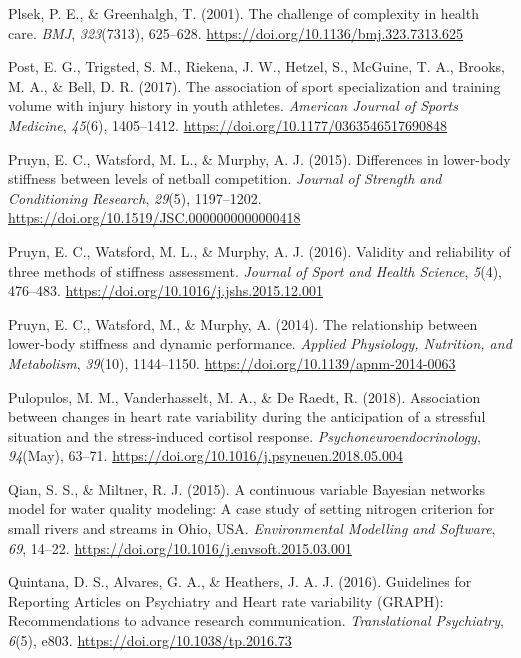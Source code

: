 \documentclass[
  english,
  man,floatsintext]{apa6}
\begin{document}
\leavevmode\hypertarget{ref-Plsek2001}{}%
Plsek, P. E., \& Greenhalgh, T. (2001). The challenge of complexity in health care. \emph{BMJ}, \emph{323}(7313), 625--628. \url{https://doi.org/10.1136/bmj.323.7313.625}

\leavevmode\hypertarget{ref-Post2017}{}%
Post, E. G., Trigsted, S. M., Riekena, J. W., Hetzel, S., McGuine, T. A., Brooks, M. A., \& Bell, D. R. (2017). The association of sport specialization and training volume with injury history in youth athletes. \emph{American Journal of Sports Medicine}, \emph{45}(6), 1405--1412. \url{https://doi.org/10.1177/0363546517690848}

\leavevmode\hypertarget{ref-Pruyn2015}{}%
Pruyn, E. C., Watsford, M. L., \& Murphy, A. J. (2015). Differences in lower-body stiffness between levels of netball competition. \emph{Journal of Strength and Conditioning Research}, \emph{29}(5), 1197--1202. \url{https://doi.org/10.1519/JSC.0000000000000418}

\leavevmode\hypertarget{ref-Pruyn2016}{}%
Pruyn, E. C., Watsford, M. L., \& Murphy, A. J. (2016). Validity and reliability of three methods of stiffness assessment. \emph{Journal of Sport and Health Science}, \emph{5}(4), 476--483. \url{https://doi.org/10.1016/j.jshs.2015.12.001}

\leavevmode\hypertarget{ref-Pruyn2014}{}%
Pruyn, E. C., Watsford, M., \& Murphy, A. (2014). The relationship between lower-body stiffness and dynamic performance. \emph{Applied Physiology, Nutrition, and Metabolism}, \emph{39}(10), 1144--1150. \url{https://doi.org/10.1139/apnm-2014-0063}

\leavevmode\hypertarget{ref-Pulopulos2018}{}%
Pulopulos, M. M., Vanderhasselt, M. A., \& De Raedt, R. (2018). Association between changes in heart rate variability during the anticipation of a stressful situation and the stress-induced cortisol response. \emph{Psychoneuroendocrinology}, \emph{94}(May), 63--71. \url{https://doi.org/10.1016/j.psyneuen.2018.05.004}

\leavevmode\hypertarget{ref-Qian2015}{}%
Qian, S. S., \& Miltner, R. J. (2015). A continuous variable Bayesian networks model for water quality modeling: A case study of setting nitrogen criterion for small rivers and streams in Ohio, USA. \emph{Environmental Modelling and Software}, \emph{69}, 14--22. \url{https://doi.org/10.1016/j.envsoft.2015.03.001}

\leavevmode\hypertarget{ref-Quintana2016a}{}%
Quintana, D. S., Alvares, G. A., \& Heathers, J. A. J. (2016). Guidelines for Reporting Articles on Psychiatry and Heart rate variability (GRAPH): Recommendations to advance research communication. \emph{Translational Psychiatry}, \emph{6}(5), e803. \url{https://doi.org/10.1038/tp.2016.73}
\end{document}
